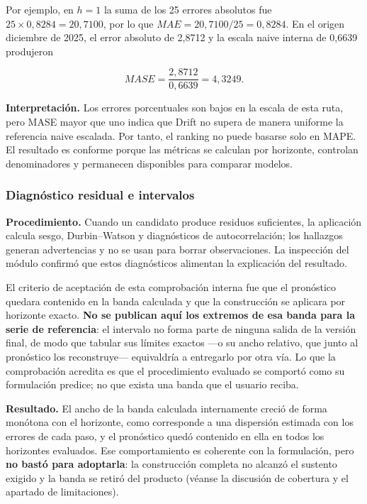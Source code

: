 \documentclass[12pt,letterpaper]{article}
\begin{document}
Por ejemplo, en \(h=1\) la suma de los 25 errores absolutos fue \(25\times0,8284=20,7100\), por lo que \(MAE=20,7100/25=0,8284\). En el origen diciembre de 2025, el error absoluto de 2,8712 y la escala naive interna de 0,6639 produjeron

\begin{equation}
MASE=\frac{2,8712}{0,6639}=4,3249.
\end{equation}

\textbf{Interpretación.} Los errores porcentuales son bajos en la escala de esta ruta, pero MASE mayor que uno indica que Drift no supera de manera uniforme la referencia naive escalada. Por tanto, el ranking no puede basarse solo en MAPE. El resultado es conforme porque las métricas se calculan por horizonte, controlan denominadores y permanecen disponibles para comparar modelos.

\subsubsection{Diagnóstico residual e intervalos}
\label{sec:diagnostico_residual_intervalos}

\textbf{Procedimiento.} Cuando un candidato produce residuos suficientes, la aplicación calcula sesgo, Durbin--Watson y diagnósticos de autocorrelación; los hallazgos generan advertencias y no se usan para borrar observaciones. La inspección del módulo confirmó que estos diagnósticos alimentan la explicación del resultado.

El criterio de aceptación de esta comprobación interna fue que el pronóstico quedara contenido en la banda calculada y que la construcción se aplicara por horizonte exacto. \textbf{No se publican aquí los extremos de esa banda para la serie de referencia}: el intervalo no forma parte de ninguna salida de la versión final, de modo que tabular sus límites exactos ---o su ancho relativo, que junto al pronóstico los reconstruye--- equivaldría a entregarlo por otra vía. Lo que la comprobación acredita es que el procedimiento evaluado se comportó como su formulación predice; no que exista una banda que el usuario reciba.


\textbf{Resultado.} El ancho de la banda calculada internamente creció de forma monótona con el horizonte, como corresponde a una dispersión estimada con los errores de cada paso, y el pronóstico quedó contenido en ella en todos los horizontes evaluados. Ese comportamiento es coherente con la formulación, pero \textbf{no bastó para adoptarla}: la construcción completa no alcanzó el sustento exigido y la banda se retiró del producto (véanse la discusión de cobertura y el apartado de limitaciones).
\end{document}
